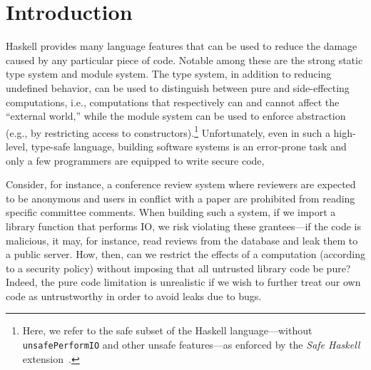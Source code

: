 \section{Introduction}
\label{sec:intro}

Haskell provides many language features that can be used to reduce the
damage caused by any particular piece of code.
%
Notable among these are the strong static type system and module
system.
%
The type system, in addition to reducing undefined behavior, can be
used to distinguish between pure and side-effecting computations,
i.e., computations that respectively can and cannot affect the
``external world,'' while the module system can be used to enforce
abstraction (e.g., by restricting access to constructors).\footnote{
  Here, we refer to the safe subset of the Haskell language---without
  \texttt{unsafePerformIO} and other unsafe features---as enforced by
  the \emph{Safe Haskell} extension~\cite{safehaskell}.
}
%
Unfortunately, even in such a high-level, type-safe language, building
software systems is an error-prone task and only a few programmers are
equipped to write secure code,
 
Consider, for instance, a conference review system where reviewers are
expected to be anonymous and users in conflict with a paper are
prohibited from reading specific committee comments.
%
When building such a system, if we import a library function that
performs IO, we risk violating these grantees---if the code is
malicious, it may, for instance, read reviews from the database and
leak them to a public server.
%
How, then, can we restrict the effects of a computation (according to
a security policy) without imposing that all untrusted library code be
pure?
%
Indeed, the pure code limitation is unrealistic if we wish to further
treat our own code as untrustworthy in order to avoid leaks due to
bugs.
